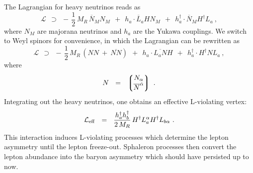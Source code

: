 \documentclass[12pt]{revtex4}
\newcommand{\ov}{\overline}
\begin{document}
	The Lagrangian for heavy neutrinos reads as
\begin{equation}
	\mathcal{L}  ~~\supset~~ -\,\frac 12\, M_R\, \ov{N}{}_MN_M ~~+~~
				h_a\cdot \ov{L}_aHN_M ~~+~~  
				h_a^\dagger\cdot \ov{N}{}_MH^\dagger L_a~,
\end{equation}
	where $ N_M $ are majorana neutrinos and $ h_a $ are the Yukawa couplings.
	We switch to Weyl spinors for convenience, in which the Lagrangian can be rewritten as
\begin{equation}
	\mathcal{L}  ~~\supset~~ 
	-\,\frac 12\, M_R\, \left( NN ~+~ \ov{N N} \right) ~~+~~
				h_a\cdot \ov{L_a N}H ~~+~~  
				h_a^\dagger\cdot H^\dagger N L_a~,
\end{equation}
	where
\[	
	N  ~~=~~ \left\lgroup 
		\begin{matrix}
			N_\alpha \\
			\ov{N}^{\dot{\alpha}}
		\end{matrix}
		\right\rgroup~.
\]
	Integrating out the heavy neutrinos, one obtains an effective L-violating vertex:
\begin{equation}
\label{L_eff}
	\mathcal{L}_{\rm eff} ~~=~~ \frac{h_a^\dag h_b^\dag}{2\, M_R} \, H^\dag L_a^\alpha H^\dag L_{b\alpha}~.
\end{equation}
	This interaction induces L-violating processes which determine the lepton asymmetry
	until the lepton freeze-out.
	Sphaleron processes then convert the lepton abundance into the baryon asymmetry which
	should have persisted up to now.

\end{document}
